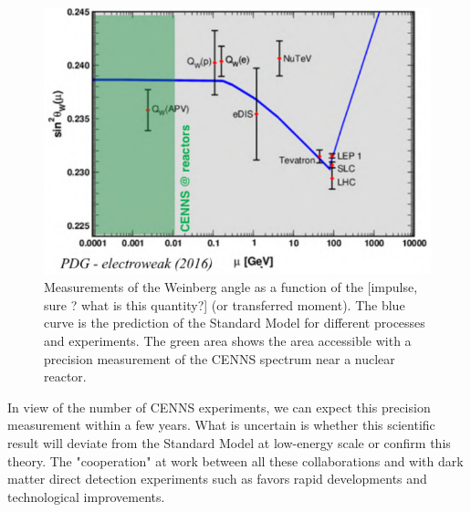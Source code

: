 \begin{figure}
\centering
\includegraphics[scale=1]{Figures/Introduction/weinberg_angle.pdf}
\caption{Measurements of the Weinberg angle as a function of the [impulse, sure ? what is this quantity?] (or transferred moment). The blue curve is the prediction of the Standard Model for different processes and experiments. The green area shows the area accessible with a precision measurement of the CENNS spectrum near a nuclear reactor.}
\label{fig:weinberg-angle}
\end{figure}

In view of the number of CENNS experiments, we can expect this precision measurement within a few years. What is uncertain is whether this scientific result will deviate from the Standard Model at low-energy scale or confirm this theory. The "cooperation" at work between all these collaborations and with dark matter direct detection experiments such as \Edelweiss{} favors rapid developments and technological improvements.


\subsection{\Ricochet{}}

